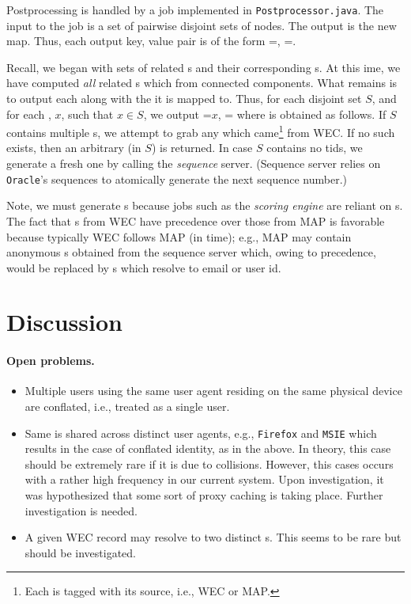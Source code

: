 \documentclass{article}[12pt]
\numberwithin{figure}{section}
\begin{document}
Postprocessing is handled by a {\MAPREDUCE} job implemented in \texttt{Postprocessor.java}.  The input to the job is a set
of pairwise disjoint sets of nodes.  The output is the new {\PSGUIDMAP} map.  Thus, each output key, value pair is of the form \KEY={\PSGUID}, \VALUE={\TID}.

Recall, we began with sets of related {\GUID}s and their corresponding {\TID}s.  At this ime, we have computed \emph{all} related {\PSGUID}s
which from connected components.
What remains is to output each {\PSGUID} along with the {\TID} it is mapped to.
Thus, for each disjoint set $S$, and for each {\PSGUID}, $x$, such that $x \in S$, we output \KEY=$x$, \VALUE={\TID} where {\TID} is obtained
as follows.
If $S$ contains multiple {\TID}s, we attempt to grab any {\TID} which came\footnote{Each {\TID} is tagged with its source, i.e., WEC or MAP.}
from WEC.  If no such {\TID} exists, then an arbitrary {\TID} (in $S$) is returned.  In case $S$ contains no tids, we generate a fresh
one by calling the \emph{sequence} server.  (Sequence server relies on \texttt{Oracle}'s sequences to atomically generate the next sequence number.)

Note, we must generate {\TID}s because jobs such as the \emph{scoring engine} are reliant on {\TID}s. 
The fact that {\TID}s from WEC have precedence over those from MAP is favorable because typically WEC follows MAP (in time); e.g., MAP may contain
anonymous {\TID}s obtained from the sequence server which, owing to precedence, would be replaced by {\TID}s which resolve to email or user id.

\section{Discussion}

\paragraph{Open problems.}

\begin{itemize}

\item Multiple users using the same user agent residing on the same physical device are conflated, i.e., treated as a single user.

\item Same {\PSGUID} is shared across distinct user agents, e.g., \texttt{Firefox} and \texttt{MSIE} which results in the case of
conflated identity, as in the above.  In theory, this case should be extremely rare if it is due to {\PSGUID} collisions.
However, this cases occurs with a rather high frequency in our current system.  Upon investigation, it was hypothesized that
some sort of proxy caching is taking place.  Further investigation is needed.

\item A given WEC record may resolve to two distinct {\TID}s.  This seems to be rare but should be investigated.
\end{itemize}
\end{document}
